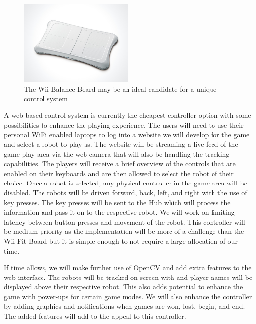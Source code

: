 \documentclass[11pt]{ieeeconf}
\begin{document}
\begin{figure}[H]
\centering
\captionsetup{justification=centering}
\includegraphics[width=0.5\textwidth]{images/wii.jpg}
\caption{The Wii Balance Board may be an ideal candidate for a unique control system \cite{wiiboard:19}}
\label{Wii}
\end{figure}

A web-based control system is currently the cheapest controller option with some possibilities to enhance the playing experience. The users will need to use their personal WiFi enabled laptops to log into a website we will develop for the game and select a robot to play as. The website will be streaming a live feed of the game play area via the web camera that will also be handling the tracking capabilities. The players will receive a brief overview of the controls that are enabled on their keyboards and are then allowed to select the robot of their choice. Once a robot is selected, any physical controller in the game area will be disabled. The robots will be driven forward, back, left, and right with the use of key presses. The key presses will be sent to the Hub which will process the information and pass it on to the respective robot. We will work on limiting latency between button presses and movement of the robot. This controller will be medium priority as the implementation will be more of a challenge than the Wii Fit Board but it is simple enough to not require a large allocation of our time.

If time allows, we will make further use of OpenCV and add extra features to the web interface. The robots will be tracked on screen with and player names will be displayed above their respective robot. This also adds potential to enhance the game with power-ups for certain game modes. We will also enhance the controller by adding graphics and notifications when games are won, lost, begin, and end. The added features will add to the appeal to this controller.
\end{document}
